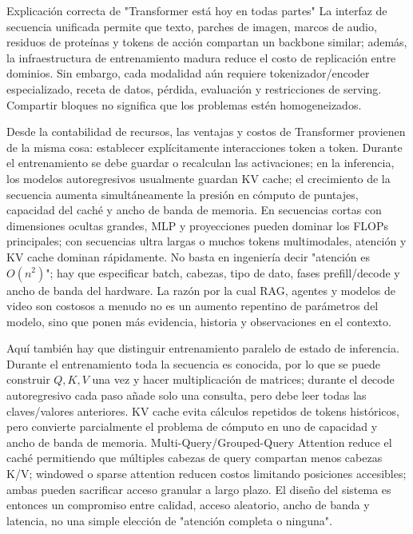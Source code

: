 \documentclass[a4paper]{article}
\begin{document}

\begin{importantbox}{Explicación correcta de "Transformer está hoy en todas partes"}
La interfaz de secuencia unificada permite que texto, parches de imagen, marcos de audio, residuos de proteínas y tokens de acción compartan un backbone similar; además, la infraestructura de entrenamiento madura reduce el costo de replicación entre dominios. Sin embargo, cada modalidad aún requiere tokenizador/encoder especializado, receta de datos, pérdida, evaluación y restricciones de serving. Compartir bloques no significa que los problemas estén homogeneizados.
\end{importantbox}

Desde la contabilidad de recursos, las ventajas y costos de Transformer provienen de la misma cosa: establecer explícitamente interacciones token a token. Durante el entrenamiento se debe guardar o recalculan las activaciones; en la inferencia, los modelos autoregresivos usualmente guardan KV cache; el crecimiento de la secuencia aumenta simultáneamente la presión en cómputo de puntajes, capacidad del caché y ancho de banda de memoria. En secuencias cortas con dimensiones ocultas grandes, MLP y proyecciones pueden dominar los FLOPs principales; con secuencias ultra largas o muchos tokens multimodales, atención y KV cache dominan rápidamente. No basta en ingeniería decir "atención es $O(n^2)$"; hay que especificar batch, cabezas, tipo de dato, fases prefill/decode y ancho de banda del hardware. La razón por la cual RAG, agentes y modelos de video son costosos a menudo no es un aumento repentino de parámetros del modelo, sino que ponen más evidencia, historia y observaciones en el contexto.

Aquí también hay que distinguir entrenamiento paralelo de estado de inferencia. Durante el entrenamiento toda la secuencia es conocida, por lo que se puede construir $Q,K,V$ una vez y hacer multiplicación de matrices; durante el decode autoregresivo cada paso añade solo una consulta, pero debe leer todas las claves/valores anteriores. KV cache evita cálculos repetidos de tokens históricos, pero convierte parcialmente el problema de cómputo en uno de capacidad y ancho de banda de memoria. Multi-Query/Grouped-Query Attention reduce el caché permitiendo que múltiples cabezas de query compartan menos cabezas K/V; windowed o sparse attention reducen costos limitando posiciones accesibles; ambas pueden sacrificar acceso granular a largo plazo. El diseño del sistema es entonces un compromiso entre calidad, acceso aleatorio, ancho de banda y latencia, no una simple elección de "atención completa o ninguna".
\end{document}

